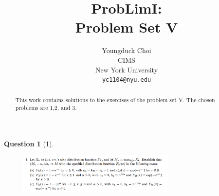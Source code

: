 \documentclass{article} %
\title{ProbLimI: \\
Problem Set V}
\author{
Youngduck Choi \\
CIMS \\
New York University\\
\texttt{yc1104@nyu.edu} \\
}
\theoremstyle{quest}
\newtheorem*{question}{Question}
\begin{document}
\maketitle

\begin{abstract}
This work contains solutions to the exercises of the problem set V. The
chosen problems are 1,2, and 3.
\end{abstract}

\bigskip

\begin{question}[1]
\hfill
\begin{figure}[h!]
  \centering
    \includegraphics[width=0.7\textwidth]{prob-e5-p1.png}
\end{figure}
\end{question}
\end{document}
